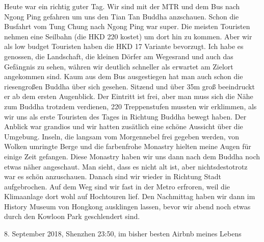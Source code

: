 \documentclass[11pt]{book}
\begin{document}
Heute war ein richtig guter Tag. Wir sind mit der MTR und dem Bus nach Ngong Ping gefahren um uns den Tian Tan 
Buddha anzschauen. Schon die Busfahrt vom Tung Chung nach Ngong Ping war super. Die meisten Touristen nehmen 
eine Seilbahn (die HKD 220 kostet) um dort hin zu kommen. Aber wir als low budget Touristen haben die HKD 17 
Variante bevorzugt. Ich habe es genossen, die Landschaft, die kleinen Dörfer am Wegesrand und auch das 
Gefängnis zu sehen, währen wir deutlich schneller als erwartet am Zielort angekommen sind. Kaum aus dem 
Bus ausgestiegen hat man auch schon die riesengroßen Buddha über sich gesehen. Sitzend und über 35m groß 
beeindruckt er ab dem ersten Augenblick. Der Eintritt ist frei, aber man muss sich die Nähe zum Buddha trotzdem 
verdienen, 220 Treppenstufen mussten wir erklimmen, als wir uns als erste Touristen des Tages in Richtung 
Buddha bewegt haben. Der Anblick war grandios und wir hatten zusätlich eine schöne Aussicht über die Umgebung.
Inseln, die langsam vom Morgennebel frei gegeben werden, von Wolken umringte Berge und die farbenfrohe Monastry 
hielten meine Augen für einige Zeit gefangen. Diese Monastry haben wir uns dann nach dem Buddha noch etwas 
näher angeschaut. Man sieht, dass es nicht alt ist, aber nichtsdestotrotz war es schön anzuschauen. 
Danach sind wir wieder in Richtung Stadt aufgebrochen. Auf dem Weg sind wir fast in der Metro erfroren, weil 
die Klimaanlage dort wohl auf Hochtouren lief. Den Nachmittag haben wir dann im History Museum von Hongkong 
ausklingen lassen, bevor wir abend noch etwas durch den Kowloon Park geschlendert sind.

8. September 2018, Shenzhen 23:50, im bisher besten Airbnb meines Lebens
\end{document}
